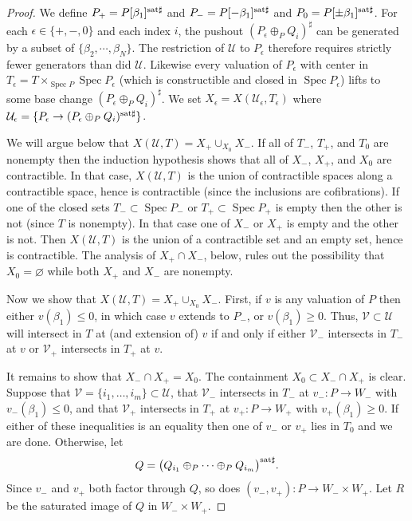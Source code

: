 \documentclass[10pt]{article}
\numberwithin{equation}{section}
\theoremstyle{definition}
\theoremstyle{remark}
\def\Spec{\operatorname{Spec}}
\def\spec{\Spec}
\begin{document}
\begin{proof}
	We define $P_+ = P[\beta_1]^{\rm sat\sharp}$ and $P_- = P[-\beta_1]^{\rm sat\sharp}$ and $P_0 = P[\pm \beta_1]^{\rm sat\sharp}$.  For each $\epsilon \in \{+, -, 0\}$ and each index $i$, the pushout $(P_\epsilon \oplus_P Q_i)^\sharp$ can be generated by a subset of $\{\beta_2, \cdots, \beta_N\}$.  The restriction of $\mathcal U$ to $P_\epsilon$ therefore requires strictly fewer generators than did $\mathcal U$.  Likewise every valuation of $P_\epsilon$ with center in $T_\epsilon = T \times_{\spec P} \spec P_\epsilon$ (which is constructible and closed in $\spec P_\epsilon$) lifts to some base change $(P_\epsilon \oplus_P Q_i)^\sharp$.  We set $X_\epsilon = X(\mathcal U_\epsilon, T_\epsilon)$ where $\mathcal U_\epsilon = \{ P_\epsilon \to (P_\epsilon \oplus_P Q_i)^{\rm sat\sharp} \}$.






	
	We will argue below that $X(\mathcal U, T) = X_+ \cup_{X_0} X_-$.  
	If all of $T_-$, $T_+$, and $T_0$ are nonempty then the induction hypothesis shows that all of $X_-$, $X_+$, and $X_0$ are contractible.
	In that case, $X(\mathcal U, T)$ is the union of contractible spaces along a contractible space, hence is contractible (since the inclusions are cofibrations).  
	If one of the closed sets $T_- \subset \spec P_-$ or $T_+ \subset \spec P_+$ is empty then the other is not (since $T$ is nonempty).  In that case one of $X_-$ or $X_+$ is empty and the other is not.  Then $X(\mathcal U, T)$ is the union of a contractible set and an empty set, hence is contractible.  The analysis of $X_+ \cap X_-$, below, rules out the possibility that $X_0 = \varnothing$ while both $X_+$ and $X_-$ are nonempty.


	



	Now we show that $X(\mathcal U, T) = X_+ \cup_{X_0} X_-$.  First, if $v$ is any valuation of $P$ then either $v(\beta_1) \leq 0$, in which case $v$ extends to $P_-$, or $v(\beta_1) \geq 0$.  Thus, $\mathcal V \subset \mathcal U$ will intersect in $T$ at (and extension of) $v$ if and only if either $\mathcal V_-$ intersects in $T_-$ at $v$ or $\mathcal V_+$ intersects in $T_+$ at $v$.





	It remains to show that $X_- \cap X_+ = X_0$.  The containment $X_0 \subset X_- \cap X_+$ is clear.  Suppose that $\mathcal V = \{ i_1, \ldots, i_m \} \subset \mathcal U$, that $\mathcal V_-$ intersects in $T_-$ at $v_- : P \to W_-$ with $v_-(\beta_1) \leq 0$, and that $\mathcal V_+$ intersects in $T_+$ at $v_+ : P \to W_+$ with $v_+(\beta_1) \geq 0$.  If either of these inequalities is an equality then one of $v_-$ or $v_+$ lies in $T_0$ and we are done.  Otherwise, let 
	\begin{equation*}
		Q = \bigl( Q_{i_1} \oplus_P \cdots \oplus_P Q_{i_m} \bigr)^{\rm sat\sharp} .
	\end{equation*}
	Since $v_-$ and $v_+$ both factor through $Q$, so does $(v_-, v_+) : P \to W_- \times W_+$.  Let $R$ be the saturated image of $Q$ in $W_- \times W_+$.


\end{proof}
\end{document}
